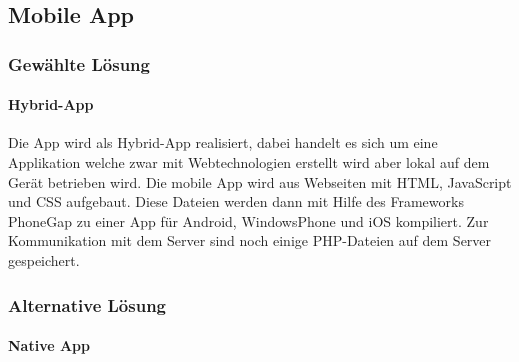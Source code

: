 \subsection{Mobile App}

\subsubsection{Gewählte Lösung}

\paragraph*{Hybrid-App\\}

Die App wird als Hybrid-App realisiert, dabei handelt es sich um eine Applikation welche zwar mit Webtechnologien erstellt wird aber lokal auf dem Gerät betrieben wird.
Die mobile App wird aus Webseiten mit HTML, JavaScript und CSS aufgebaut. Diese Dateien werden dann mit Hilfe des Frameworks PhoneGap zu einer App für Android, WindowsPhone und iOS kompiliert. Zur Kommunikation mit dem Server sind noch einige PHP-Dateien auf dem Server gespeichert.


\subsubsection{Alternative Lösung}
\paragraph*{Native App\\}

